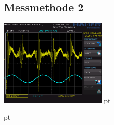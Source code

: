 \documentclass[12pt]{article}
\begin{document}
\subsection{Messmethode 2} \label{FUCKTHISSHIT}

\begin{minipage}[h!]{\textwidth}
	\centering
	\includegraphics[width=0.4\textwidth]{data/HHH05.PNG} pt
\end{minipage}
 pt
\end{document}
